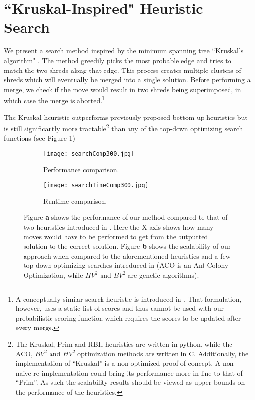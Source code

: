 \documentclass{llncs}
\begin{document}
\section{``Kruskal-Inspired" Heuristic Search}
We present a search method inspired by the minimum spanning tree ``Kruskal's algorithm" \cite{P13}. The method greedily picks the most probable edge and tries to match the two shreds along that edge. This process creates multiple clusters of shreds which will eventually be merged into a single solution. Before performing a merge, we check if the move would result in two shreds being superimposed, in which case the merge is aborted.\footnote{A conceptually similar search heuristic is introduced in \cite{P5}. That formulation, however, uses a static list of scores and thus cannot be used with our probabilistic scoring function which requires the scores to be updated after every merge.} 

The Kruskal heuristic outperforms previously proposed bottom-up heuristics but is still significantly more tractable\footnote{The Kruskal, Prim and RBH heuristics are written in python, while the ACO, $BV^2$ and $HV^2$ optimization methods are written in C. Additionally, the implementation of “Kruskal” is a non-optimized proof-of-concept. A non-naive re-implementation could bring its performance more in line to that of “Prim”. As such the scalability results should be viewed as upper bounds on the performance of the heuristics.}  than any of the top-down optimizing search functions (see Figure \ref{fig:searchScal}).

\begin{figure}[h]
    \centering
    \begin{subfigure}[b]{0.48\textwidth}
        \centering
        \texttt{[image: searchComp300.jpg]}
        \caption{Performance comparison.}
    \end{subfigure}
    \begin{subfigure}[b]{0.48\textwidth}
        \centering
        \texttt{[image: searchTimeComp300.jpg]}
        \caption{Runtime comparison.}
    \end{subfigure}
     \caption{Figure {\bf a} shows the performance of our method compared to that of two heuristics introduced in \cite{P3}. Here the X-axis shows how many moves would have to be performed to get from the outputted solution to the correct solution. Figure {\bf b} shows the scalability of our approach when compared to the aforementioned heuristics and a few top down optimizing searches introduced in \cite{P4} (ACO is an Ant Colony Optimization, while $HV^2$ and $BV^2$ are genetic algorithms).}
    \label{fig:searchScal}
\end{figure}
\end{document}
